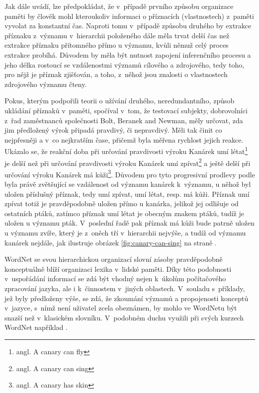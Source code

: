 \documentclass[a4paper,11pt,openany,twoside]{book}
\newcommand\ex{\textsf}
\begin{document}
				Jak \textcite{collins1969retrieval} dále uvádí, lze předpokládat, že v~případě prvního způsobu organizace paměti by člověk mohl kteroukoliv informaci o příznacích (vlastnostech) z~paměti vyvolat za konstantní čas. Naproti tomu v~případě způsobu druhého by extrakce příznaku z~významu v~hierarchii položeného dále měla trvat delší čas než extrakce příznaku přítomného přímo u významu, kvůli němuž celý proces extrakce probíhá. Důvodem by měla být nutnost zapojení inferenčního procesu a jeho délka rostoucí se vzdálenostmi významů cílového a zdrojového, tedy toho, pro nějž je příznak zjišťován, a toho, z~něhož jsou znalosti o vlastnostech zdrojového významu čteny.

				Pokus, kterým podpořili \textcite{collins1969retrieval} teorii o užívání druhého, neredundantního, způsob ukládání příznaků v~paměti, spočíval v~tom, že testovací subjekty, dobrovolníci z~řad zaměstnanců společnosti Bolt, Beranek and Newman, měly určovat, zda jim předložený výrok připadá pravdivý, či nepravdivý. Měli tak činit co nejpřesněji a v~co nejkratším čase, přičemž byla měřena rychlost jejich reakce. Ukázalo se, že reakční doba při určování pravdivosti výroku \ex{Kanárek umí létat}\footnote{angl. \ex{A canary can fly}} je delší než při určování pravdivosti výroku \ex{Kanárek umí zpívat}\footnote{angl. \ex{A canary can sing}} a ještě delší při určování výroku \ex{Kanárek má kůži}\footnote{angl. \ex{A canary has skin}}. Důvodem pro tyto progresivní prodlevy podle \textcite{collins1969retrieval} byla právě zvětšující se vzdálenost od významu \ex{kanárek} k~významu, u něhož byl uložen příslušný příznak, tedy \ex{umí zpívat}, \ex{umí létat}, resp. \ex{má kůži}. Příznak \ex{umí zpívat} totiž je pravděpodobně uložen přímo u \ex{kanárka}, jelikož jej odlišuje od ostatních ptáků, zatímco příznak \ex{umí létat} je obecným znakem ptáků, tudíž je uložen u významu \ex{pták}. V~poslední řadě pak příznak \ex{má kůži} bude patrně uložen u významu \ex{zvíře}, který je z~oněch tří v~hierarchii nejvýše, a tudíž od významu \ex{kanárek} nejdále, jak ilustruje obrázek \ref{fig:canary-can-sing} na straně \pageref{fig:canary-can-sing}.

				WordNet se svou hierarchickou organizací slovní zásoby pravděpodobně konceptuálně blíží organizaci lexika v~lidské paměti. Díky této podobnosti v~uspořádání informací se zdá být vhodný nejen k~úkolům počítačového zpracování jazyka, ale i k~činnostem v~jiných oblastech. V~souladu s~příklady, jež byly předloženy výše, se zdá, že zkoumání významů a propojenosti konceptů v~jazyce, s~nímž není uživatel zcela obeznámen, by mohlo ve WordNetu být snazší než v~klasickém slovníku. V~podobném duchu využili při svých kurzech WordNet například \textcite{lemnitzer2003using}.
			
\end{document}
